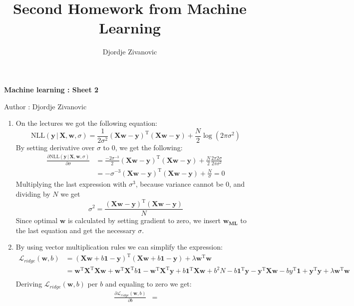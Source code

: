 \documentclass[10pt,a4paper]{article}
\author{Djordje Zivanovic}
\title{Second Homework from Machine Learning}
\begin{document}
\centerline{\large \bf Machine learning : Sheet 2}
\centerline{\large Author : Djordje Zivanovic}
\bigskip
\newcommand{\transpose}[1]{#1 ^ \text{T}}

\begin{enumerate}
\item
On the lectures we got the following equation:
$$\text{NLL}(\textbf{y}\,\vert\,\textbf{X}, \textbf{w}, \sigma)= \frac{1}{2\sigma^2}(\textbf{Xw} - \textbf{y})^\text{T}(\textbf{Xw} - \textbf{y}) + \frac{N}{2}\log(2\pi\sigma^2)$$
By setting derivative over $\sigma$ to 0, we get the following:
\begin{align*}
\frac{\partial \text{NLL}(\textbf{y}\,\vert\,\textbf{X}, \textbf{w}, \sigma)}{\partial \sigma} &= \frac{-2\sigma^{-3}}{2} (\textbf{Xw} - \textbf{y})^\text{T}(\textbf{Xw} - \textbf{y}) + 
\frac{N}{2}\frac{2\pi 2\sigma}{2\pi\sigma^2}\\
&= -\sigma^{-3} (\textbf{Xw} - \textbf{y})^\text{T}(\textbf{Xw} - \textbf{y}) + \frac{N}{\sigma} = 0
\end{align*}
Multiplying the last expression with $\sigma^3$, because variance cannot be 0, and dividing by $N$ we get $$\sigma^2 =\frac{(\textbf{Xw} - \textbf{y})^\text{T}(\textbf{Xw} - \textbf{y})}{N} $$
Since optimal $\textbf{w}$ is calculated by setting gradient to zero, we insert $\textbf{w}_{\textbf{ML}}$ to the last equation and get the necessary $\sigma$.
\item By using vector multiplication rules we can simplify the expression:
\begin{align*}
\mathcal{L}_{ridge}(\textbf{w},b) 
&= \transpose{(\textbf{Xw}+b\textbf{1}-\textbf{y})}(\textbf{Xw}+b\textbf{1}-\textbf{y})+\lambda \transpose{\textbf{w}}\textbf{w}\\
&= \transpose{\textbf{w}}\transpose{\textbf{X}}\textbf{Xw} + \transpose{\textbf{w}}\transpose{\textbf{X}}b\textbf{1}-\transpose{\textbf{w}}\transpose{\textbf{X}}\textbf{y}+b\transpose{\textbf{1}}\textbf{X}\textbf{w} + b^2N -b\transpose{\textbf{1}}\textbf{y} - \transpose{\textbf{y}}\textbf{Xw}-b\transpose{y}\textbf{1} + \transpose{\textbf{y}} \textbf{y} + \lambda \transpose{\textbf{w}}\textbf{w}\\
\end{align*}
Deriving $\mathcal{L}_{ridge}(\textbf{w},b) $ per $b$ and equaling to zero we get:
\begin{align*}
\frac{\partial\mathcal{L}_{ridge}(\textbf{w},b)}{\partial b} &= 

\end{align*}
\end{enumerate}
\end{document}
